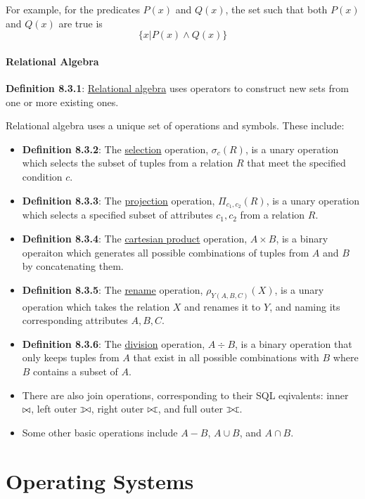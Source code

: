 \documentclass{article}
\newcommand{\separate}[1] {\vspace{#1 pt}\noindent}
\newcommand{\definition}[2]{\textbf{Definition #1}: #2\label{def:#1}}
\newcommand{\ojoin}{\setbox0=\hbox{$\bowtie$}%
    \rule[-.02ex]{.25em}{.4pt}\llap{\rule[\ht0]{.25em}{.4pt}}}
\newcommand{\insertinnerjoin}{\mathbin{\bowtie\mkern-5.8mu}\;}
\newcommand{\insertleftouterjoin}{\mathbin{\ojoin\mkern-5.8mu\bowtie}}
\newcommand{\insertrightouterjoin}{\mathbin{\bowtie\mkern-5.8mu\ojoin}}
\newcommand{\insertfullouterjoin}{\mathbin{\ojoin\mkern-5.8mu\bowtie\mkern-5.8mu\ojoin}}
\begin{document}
\separate{5}For example, for the predicates \(P(x)\) and \(Q(x)\), the set such that both \(P(x)\) and \(Q(x)\) are true is 
\begin{equation}
    \{x|P(x) \land Q(x)\}
\end{equation}

\subsection{Relational Algebra}

\definition{8.3.1}{\underline{Relational algebra} uses operators to construct new sets from one or more existing ones.}

\separate{5}Relational algebra uses a unique set of operations and symbols. These include:
\begin{itemize}
    \item \definition{8.3.2}{The \underline{selection} operation, \(\sigma_c(R)\), is a unary operation which selects the subset of tuples from a relation \(R\) that meet the specified condition \(c\).}
    \item \definition{8.3.3}{The \underline{projection} operation, \(\Pi_{c_1,c_2}(R)\), is a unary operation which selects a specified subset of attributes \(c_1, c_2\) from a relation \(R\).}
    \item \definition{8.3.4}{The \underline{cartesian product} operation, \(A \times B\), is a binary operaiton which generates all possible combinations of tuples from \(A\) and \(B\) by concatenating them.}
    \item \definition{8.3.5}{The \underline{rename} operation, \(\rho_{Y(A,B,C)}(X)\), is a unary operation which takes the relation \(X\) and renames it to \(Y\), and naming its corresponding attributes \(A, B, C\).}
    \item \definition{8.3.6}{The \underline{division} operation, \(A \div B\), is a binary operation that only keeps tuples from \(A\) that exist in all possible combinations with \(B\) where \(B\) contains a subset of \(A\).}
    \item There are also join operations, corresponding to their SQL eqivalents: inner \(\insertinnerjoin\), left outer \(\insertleftouterjoin\), right outer \(\insertrightouterjoin\), and full outer \(\insertfullouterjoin\).
    \item Some other basic operations include \(A - B\), \(A \cup B\), and \(A \cap B\).
\end{itemize}

\newpage\part{Operating Systems}\label{part:4.os}
\end{document}
